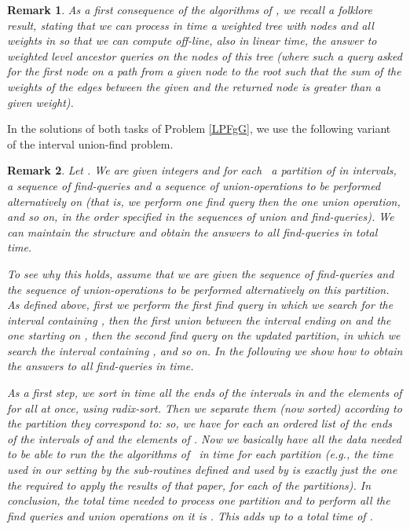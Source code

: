 \documentclass[final]{dmtcs-episciences}
\newtheorem{remark}{Remark}
\begin{document}
\begin{remark}\label{weighted_tree}As a first consequence of the algorithms of \cite{Gabow83}, we recall a folklore result, stating that we can process in  time a weighted tree with  nodes and all weights in  so that we can compute off-line, also in linear time, the answer to  weighted level ancestor queries on the nodes of this tree (where such a query asked for the first node on a path from a given node to the root such that the sum of the weights of the edges between the given and the returned node is greater than a given weight). 
\end{remark}

In the solutions of both tasks of Problem \ref{LPFgG}, we use the following variant of the interval union-find problem.
\begin{remark}\label{rem_Union_Find} 
Let . We are given integers  and for each~ a partition  of  in  intervals, a sequence of  find-queries and a sequence of  union-operations to be performed alternatively on  (that is, we perform one find query then the one union operation, and so on, in the order specified in the sequences of union and find-queries). We can maintain the structure and obtain the answers to all find-queries in  total time. 

To see why this holds, assume that we are given the sequence  of  find-queries and the sequence  of  union-operations to be performed alternatively on this partition. As defined above, first we perform the first find query in which we search for the interval containing , then the first union between the interval ending on  and the one starting on , then the second find query on the updated partition, in which we search the interval containing , and so on. In the following we show how to obtain the answers to all find-queries in  time. 

As a first step, we sort in time  all the ends of the intervals in  and the elements of  for all  at once, using radix-sort. Then we separate them (now sorted) according to the partition they correspond to: so, we have for each  an ordered list of the ends of the intervals of  and the elements of . Now we basically have all the data needed to be able to run the the algorithms of~\cite{Gabow83} in  time for each partition (e.g., the time used in our setting by the sub-routines defined and used by \cite{Gabow83} is exactly just the one the required to apply the results of that paper, for each of the partitions). In conclusion, the total time needed to process one partition and to perform all the find queries and union operations on it is . This adds up to a total time of . 
\end{remark}
\end{document}
